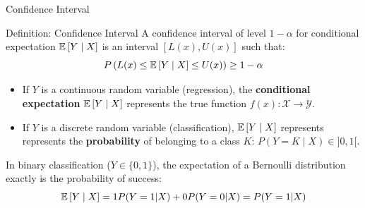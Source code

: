 \begin{frame}{Confidence Interval}
	\begin{block}{Definition: Confidence Interval}
		A confidence interval of level $1 - \alpha$ for conditional expectation $\operatorname{\mathbb{E}}\left[Y \mid X\right]$ is an interval $\left[L(x), U(x)\right]$ such that:
		\begin{equation}
			P\left(L(x) \le \operatorname{\mathbb{E}}\left[Y \mid X\right] \le U(x)\right) \ge 1 - \alpha
			\nonumber
		\end{equation}
		\begin{itemize}
			\item If $Y$ is a continuous random variable (regression), the \textbf{conditional expectation} $\operatorname{\mathbb{E}}\left[Y \mid X\right]$ represents the true function $f(x): \mathcal{X} \to \mathcal{Y}$.
			\item If $Y$ is a discrete random variable (classification), $\operatorname{\mathbb{E}}\left[Y \mid X\right]$ represents represents the \textbf{probability} of belonging to a class $K$: $P(Y = K \mid X) \in ]0, 1[$.
		\end{itemize}
	\end{block}
	\pause
	In binary classification ($Y \in \{0, 1\}$), the expectation of a Bernoulli distribution exactly is the probability of success:
	\begin{equation}
		\operatorname{\mathbb{E}}\left[Y \mid X\right] = 1 P(Y=1 | X) + 0 P(Y=0 | X) = P(Y = 1 | X)
		\nonumber
	\end{equation}
\end{frame}
